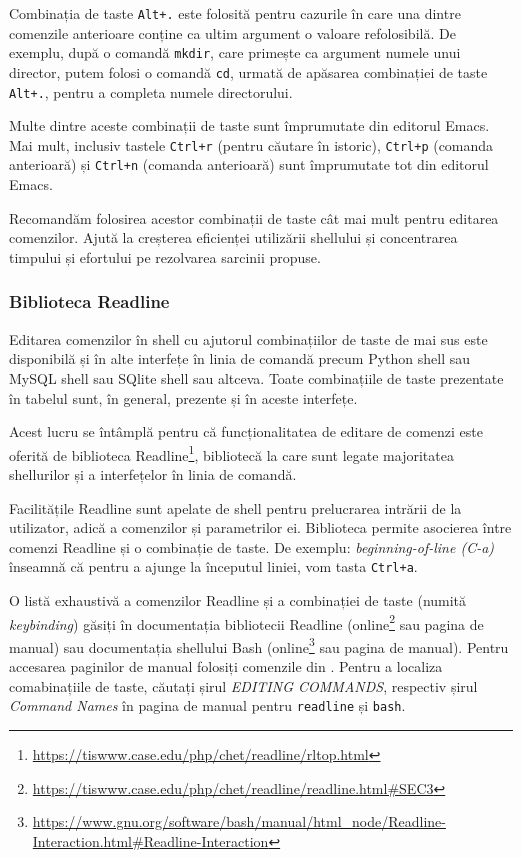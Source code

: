Combinația de taste \texttt{Alt+.} este folosită pentru cazurile în care una dintre comenzile anterioare conține ca ultim argument o valoare refolosibilă.
De exemplu, după o comandă \texttt{mkdir}, care primește ca argument numele unui director, putem folosi o comandă \texttt{cd}, urmată de apăsarea combinației de taste \texttt{Alt+.}, pentru a completa numele directorului.

Multe dintre aceste combinații de taste sunt împrumutate din editorul Emacs.
Mai mult, inclusiv tastele \texttt{Ctrl+r} (pentru căutare în istoric), \texttt{Ctrl+p} (comanda anterioară) și \texttt{Ctrl+n} (comanda anterioară) sunt împrumutate tot din editorul Emacs.

Recomandăm folosirea acestor combinații de taste cât mai mult pentru editarea comenzilor.
Ajută la creșterea eficienței utilizării shellului și concentrarea timpului și efortului pe rezolvarea sarcinii propuse.

\subsubsection{Biblioteca Readline}
\label{sec:cli:shell:features:readline}

Editarea comenzilor în shell cu ajutorul combinațiilor de taste de mai sus este disponibilă și în alte interfețe în linia de comandă precum Python shell sau MySQL shell sau SQlite shell sau altceva.
Toate combinațiile de taste prezentate în tabelul  sunt, în general, prezente și în aceste interfețe.

Acest lucru se întâmplă pentru că funcționalitatea de editare de comenzi este oferită de biblioteca Readline\footnote{\url{https://tiswww.case.edu/php/chet/readline/rltop.html}}, bibliotecă la care sunt legate majoritatea shellurilor și a interfețelor în linia de comandă.

Facilitățile Readline sunt apelate de shell pentru prelucrarea intrării de la utilizator, adică a comenzilor și parametrilor ei.
Biblioteca permite asocierea între comenzi Readline și o combinație de taste.
De exemplu: \textit{beginning-of-line (C-a)} înseamnă că pentru a ajunge la începutul liniei, vom tasta \texttt{Ctrl+a}.

O listă exhaustivă a comenzilor Readline și a combinației de taste (numită \textit{keybinding}) găsiți în documentația bibliotecii Readline (online\footnote{\url{https://tiswww.case.edu/php/chet/readline/readline.html\#SEC3}} sau pagina de manual) sau documentația shellului Bash (online\footnote{\url{https://www.gnu.org/software/bash/manual/html\_node/Readline-Interaction.html\#Readline-Interaction}} sau pagina de manual).
Pentru accesarea paginilor de manual folosiți comenzile din .
Pentru a localiza comabinațiile de taste, căutați șirul \textit{EDITING COMMANDS}, respectiv șirul \textit{Command Names} în pagina de manual pentru \texttt{readline} și \texttt{bash}.

